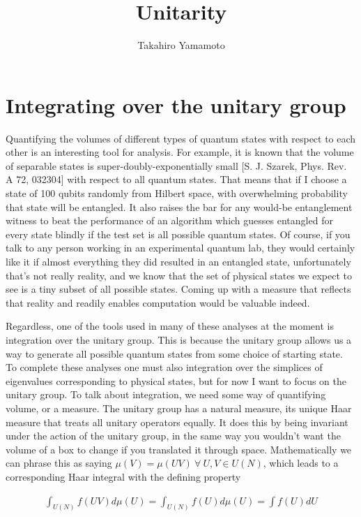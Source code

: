 \documentclass[11pt, oneside]{article}   	%
\title{Unitarity}
\author{Takahiro Yamamoto}
\begin{document}
\maketitle
\section{Integrating over the unitary group}
Quantifying the volumes of different types of quantum states with respect to each other is an interesting tool for analysis.
For example, it is known that the volume of separable states is super-doubly-exponentially small [S. J. Szarek, Phys. Rev. A 72, 032304] with respect to all quantum states. 
That means that if I choose a state of 100 qubits randomly from Hilbert space, with overwhelming probability that state will be entangled.  
It also raises the bar for any would-be entanglement witness to beat the performance of an algorithm which guesses entangled for every state blindly if the test set is all possible quantum states.  
Of course, if you talk to any person working in an experimental quantum lab, they would certainly like it if almost everything they did resulted in an entangled state, unfortunately that’s not really reality, and we know that the set of physical states we expect to see is a tiny subset of all possible states.  
Coming up with a measure that reflects that reality and readily enables computation would be valuable indeed.

Regardless, one of the tools used in many of these analyses at the moment is integration over the unitary group.  
This is because the unitary group allows us a way to generate all possible quantum states from some choice of starting state.  
To complete these analyses one must also integration over the simplices of eigenvalues corresponding to physical states, but for now I want to focus on the unitary group.  
To talk about integration, we need some way of quantifying volume, or a measure.  
The unitary group has a natural measure, its unique Haar measure that treats all unitary operators equally.  
It does this by being invariant under the action of the unitary group, in the same way you wouldn’t want the volume of a box to change if you translated it through space.  
Mathematically we can phrase this as saying $\mu(V) = \mu(UV) \ \forall \  U,V \in U(N)$, which leads to a corresponding Haar integral with the defining property

\begin{align*} 
\int_{U(N)} f(UV) d\mu(U) = \int_{U(N)} f(U) d\mu(U) = \int f(U) dU 
\end{align*}
\end{document}
